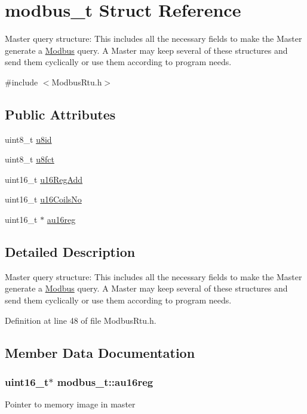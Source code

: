 \hypertarget{structmodbus__t}{\section{modbus\-\_\-t Struct Reference}
\label{structmodbus__t}
}


Master query structure\-: This includes all the necessary fields to make the Master generate a \hyperlink{class_modbus}{Modbus} query. A Master may keep several of these structures and send them cyclically or use them according to program needs.  




{\ttfamily \#include $<$Modbus\-Rtu.\-h$>$}

\subsection*{Public Attributes}
\begin{DoxyCompactItemize}
\item 
uint8\-\_\-t \hyperlink{structmodbus__t_af78ad11f93e63022a1c279de7206358c}{u8id}
\item 
uint8\-\_\-t \hyperlink{structmodbus__t_a57d1630d4548e5d50d79e206a48b09bc}{u8fct}
\item 
uint16\-\_\-t \hyperlink{structmodbus__t_a224ead9ff72467696e94fba9cf06bd3c}{u16\-Reg\-Add}
\item 
uint16\-\_\-t \hyperlink{structmodbus__t_a5b9cee9c1a9415d927543f6cf054eb43}{u16\-Coils\-No}
\item 
uint16\-\_\-t $\ast$ \hyperlink{structmodbus__t_a36212dd6316cbffb8ea31b2a2f5ae1be}{au16reg}
\end{DoxyCompactItemize}


\subsection{Detailed Description}
Master query structure\-: This includes all the necessary fields to make the Master generate a \hyperlink{class_modbus}{Modbus} query. A Master may keep several of these structures and send them cyclically or use them according to program needs. 

Definition at line 48 of file Modbus\-Rtu.\-h.



\subsection{Member Data Documentation}
\hypertarget{structmodbus__t_a36212dd6316cbffb8ea31b2a2f5ae1be}{
\subsubsection[{au16reg}]{\setlength{\rightskip}{0pt plus 5cm}uint16\-\_\-t$\ast$ modbus\-\_\-t\-::au16reg}}\label{structmodbus__t_a36212dd6316cbffb8ea31b2a2f5ae1be}
Pointer to memory image in master 

